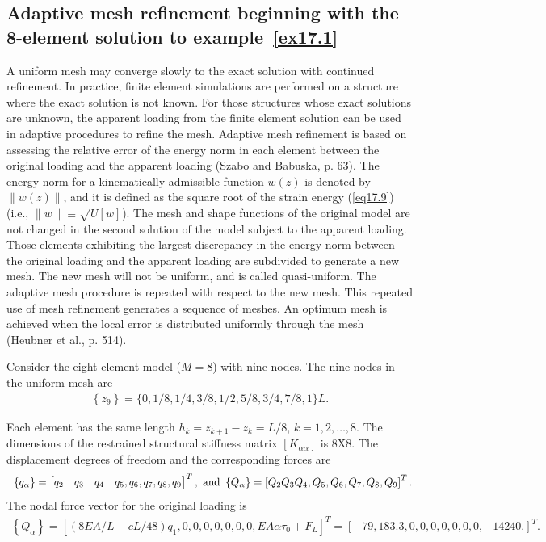 \documentclass{AeroStructure-ERJohnson}
\begin{document}
\subsection{Adaptive mesh refinement beginning with the 8-element solution to example~\ref{ex17.1}}\label{sec17.2.4}

A uniform mesh may converge slowly to the exact solution with continued refinement. In practice, finite element simulations are performed on a structure where the exact solution is not known. For those structures whose exact solutions are unknown, the apparent loading from the finite element solution can be used in adaptive procedures to refine the mesh. Adaptive mesh refinement is based on assessing the relative error of the energy norm in each element between the original loading and the apparent loading (Szabo and Babuska, p. 63). The energy norm for a kinematically admissible function $w(z)$ is denoted by $\|w(z)\|$, and it is defined as the square root of the strain energy (\ref{eq17.9}) (i.e., $\|w\| \equiv \sqrt{U[w]}$). The mesh and shape functions of the original model are not changed in the second solution of the model subject to the apparent loading. Those elements exhibiting the largest discrepancy in the energy norm between the original loading and the apparent loading are subdivided to generate a new mesh. The new mesh will not be uniform, and is called quasi-uniform. The adaptive mesh procedure is repeated with respect to the new mesh. This repeated use of mesh refinement generates a sequence of meshes. An optimum mesh is achieved when the local error is distributed uniformly through the mesh (Heubner et al., p. 514).

Consider the eight-element model ($M= 8$) with nine nodes. The nine nodes in the uniform mesh are
\begin{align}\label{eq17.45}
\left\{z_{9}\right\}=\{0,1/8,1/4,3/8,1/2,5/8,3/4,7/8,1\} L.
\end{align}

\pagebreak\noindent Each element has the same length $h_{k}=z_{k+1}-z_{k}=L/8$, $k=1,2, \ldots, 8$. The dimensions of the restrained structural stiffness matrix $\left[K_{\alpha \alpha}\right]$ is 8X8. The displacement degrees of freedom and the corresponding forces are
\begin{equation}\label{eq17.46}
\hspace*{6pt}\left\{q_{\alpha}\right\}=\left[\begin{array}{@{}llll@{}}q_{2} & q_{3} & q_{4} & q_{5}, q_{6}, q_{7}, q_{8}, q_{9}\end{array}\right]^{T}, \textrm{ and } \left\{Q_{\alpha}\right\}=\left[Q_{2} Q_{3} Q_{4}, Q_{5}, Q_{6}, Q_{7}, Q_{8}, Q_{9}\right]^{T}.
\end{equation}
The nodal force vector for the original loading is\vspace*{-4pt}
\begin{align}\label{eq17.47}
\left\{Q_{\alpha}\right\}=\left[(8 E A/L-c L/48) q_{1}, 0,0,0,0,0,0,0, E A \alpha \tau_{0}+F_{L}\right]^{T}=[-79,183.3,0,0,0,0,0,0,0,-14240 .]^{T}.
\end{align}
\end{document}

